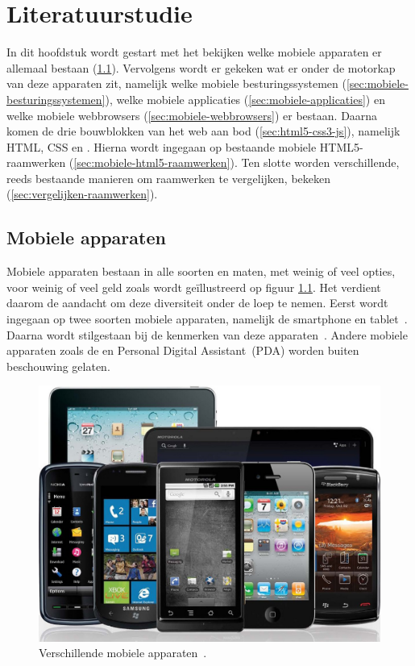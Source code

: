 \chapter{Literatuurstudie}
\label{chap:literatuurstudie}
In dit hoofdstuk wordt gestart met het bekijken welke mobiele apparaten er allemaal bestaan (\ref{sec:mobiele-apparaten}). 
Vervolgens wordt er gekeken wat er onder de motorkap van deze apparaten zit, namelijk welke mobiele besturingssystemen (\ref{sec:mobiele-besturingssystemen}), welke mobiele applicaties (\ref{sec:mobiele-applicaties}) en welke mobiele webbrowsers (\ref{sec:mobiele-webbrowsers}) er bestaan. 
Daarna komen de drie bouwblokken van het web aan bod (\ref{sec:html5-css3-js}), namelijk HTML, CSS en \js{}.
Hierna wordt ingegaan op bestaande mobiele HTML5-raamwerken (\ref{sec:mobiele-html5-raamwerken}).  
Ten slotte worden verschillende, reeds bestaande manieren om raamwerken te vergelijken, bekeken (\ref{sec:vergelijken-raamwerken}).


\section{Mobiele apparaten}
\label{sec:mobiele-apparaten}
Mobiele apparaten bestaan in alle soorten en maten, met weinig of veel opties, voor weinig of veel geld zoals wordt geïllustreerd op figuur \ref{fig:devices}. 
Het verdient daarom de aandacht om deze diversiteit onder de loep te nemen. 
Eerst wordt ingegaan op twee soorten mobiele apparaten, namelijk de smartphone en tablet~\cite{GCF2013}.
Daarna wordt stilgestaan bij de kenmerken van deze apparaten~\cite{PhilDutson2012}.
Andere mobiele apparaten zoals de  en Personal Digital Assistant~(PDA) worden buiten beschouwing gelaten.

\begin{figure}
  \centering
  \includegraphics[height=0.6\textwidth]{figuren/mobile-devices.jpg}
  \caption{Verschillende mobiele apparaten~\cite{Grady2013}.}
  \label{fig:devices}
\end{figure}

